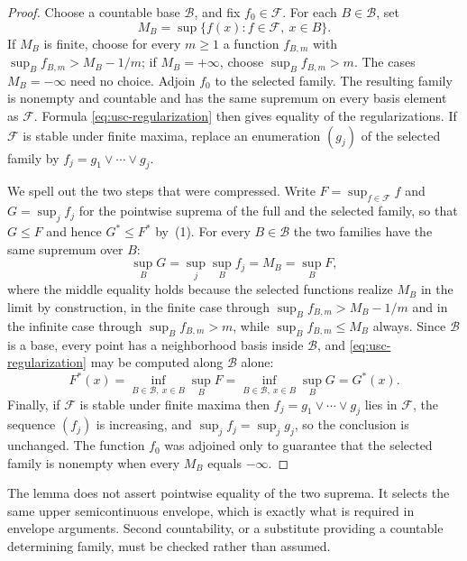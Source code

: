 \begin{proof}
Choose a countable base $\mathcal B$, and fix $f_0\in\mathcal F$.  For each
$B\in\mathcal B$, set
\[
       M_B=\sup\{f(x):f\in\mathcal F,\ x\in B\}.
\]
If $M_B$ is finite, choose for every $m\geq1$ a function $f_{B,m}$ with
$\sup_Bf_{B,m}>M_B-1/m$; if $M_B=+\infty$, choose
$\sup_Bf_{B,m}>m$.  The cases $M_B=-\infty$ need no choice.  Adjoin $f_0$ to
the selected family.  The resulting family is nonempty and countable and has
the same supremum on every basis element as
$\mathcal F$.  Formula \eqref{eq:usc-regularization} then gives equality of
the regularizations.  If $\mathcal F$ is stable under finite maxima, replace
an enumeration $(g_j)$ of the selected family by
$f_j=g_1\vee\cdots\vee g_j$.

We spell out the two steps that were compressed.  Write
$F=\sup_{f\in\mathcal F}f$ and $G=\sup_jf_j$ for the pointwise suprema of the
full and the selected family, so that $G\leq F$ and hence $G^*\leq F^*$ by
\,(1).  For every $B\in\mathcal B$ the two
families have the same supremum over $B$:
\[
 \sup_BG=\sup_j\sup_Bf_j=M_B=\sup_BF,
\]
where the middle equality holds because the selected functions realize $M_B$
in the limit by construction, in the finite case through
$\sup_Bf_{B,m}>M_B-1/m$ and in the infinite case through
$\sup_Bf_{B,m}>m$, while $\sup_Bf_{B,m}\leq M_B$ always.  Since
$\mathcal B$ is a base, every point has a neighborhood basis inside
$\mathcal B$, and \eqref{eq:usc-regularization} may be computed along
$\mathcal B$ alone:
\[
 F^*(x)=\inf_{B\in\mathcal B,\ x\in B}\sup_BF
 =\inf_{B\in\mathcal B,\ x\in B}\sup_BG=G^*(x).
\]
Finally, if $\mathcal F$ is stable under finite maxima then
$f_j=g_1\vee\cdots\vee g_j$ lies in $\mathcal F$, the sequence $(f_j)$ is
increasing, and $\sup_jf_j=\sup_jg_j$, so the conclusion is unchanged.  The
function $f_0$ was adjoined only to guarantee that the selected family is
nonempty when every $M_B$ equals $-\infty$.
\end{proof}

\begin{remark}
\label{rem:choquet-envelope-only}
The lemma does not assert pointwise equality of the two suprema.  It selects
the same upper semicontinuous envelope, which is exactly what is required in
envelope arguments.  Second countability, or a substitute providing a
countable determining family, must be checked rather than assumed.
\end{remark}

